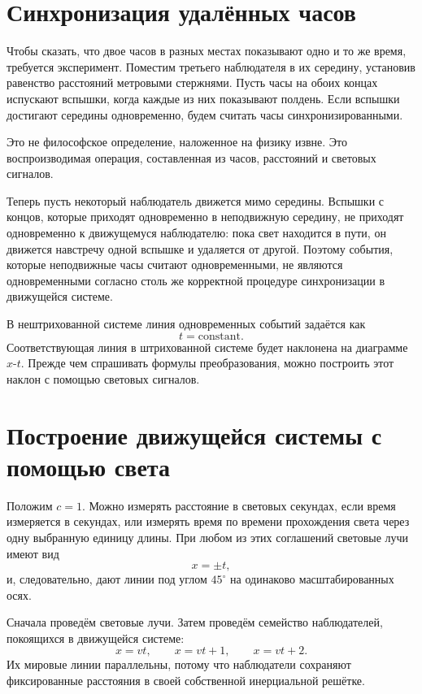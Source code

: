 \section{Синхронизация удалённых часов}

Чтобы сказать, что двое часов в разных местах показывают одно и то же время, требуется эксперимент. Поместим третьего наблюдателя в их середину, установив равенство расстояний метровыми стержнями. Пусть часы на обоих концах испускают вспышки, когда каждые из них показывают полдень. Если вспышки достигают середины одновременно, будем считать часы синхронизированными.

Это не философское определение, наложенное на физику извне. Это воспроизводимая операция, составленная из часов, расстояний и световых сигналов.

Теперь пусть некоторый наблюдатель движется мимо середины. Вспышки с концов, которые приходят одновременно в неподвижную середину, не приходят одновременно к движущемуся наблюдателю: пока свет находится в пути, он движется навстречу одной вспышке и удаляется от другой. Поэтому события, которые неподвижные часы считают одновременными, не являются одновременными согласно столь же корректной процедуре синхронизации в движущейся системе.

В нештрихованной системе линия одновременных событий задаётся как
\begin{equation}
t=\text{constant}.
\end{equation}
Соответствующая линия в штрихованной системе будет наклонена на диаграмме \(x\)-\(t\). Прежде чем спрашивать формулы преобразования, можно построить этот наклон с помощью световых сигналов.

\section{Построение движущейся системы с помощью света}

Положим \(c=1\). Можно измерять расстояние в световых секундах, если время измеряется в секундах, или измерять время по времени прохождения света через одну выбранную единицу длины. При любом из этих соглашений световые лучи имеют вид
\begin{equation}
x=\pm t,
\label{eq:sr1-light-units}
\end{equation}
и, следовательно, дают линии под углом \(45^\circ\) на одинаково масштабированных осях.

Сначала проведём световые лучи. Затем проведём семейство наблюдателей, покоящихся в движущейся системе:
\begin{equation}
x=vt,\qquad x=vt+1,\qquad x=vt+2.
\label{eq:sr1-moving-family}
\end{equation}
Их мировые линии параллельны, потому что наблюдатели сохраняют фиксированные расстояния в своей собственной инерциальной решётке.

